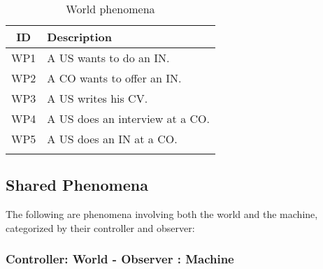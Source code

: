 \renewcommand{\arraystretch}{1.5}
\begin{longtable}{|c|p{10.5cm}|}
    \hline \rowcolor{polimiblue!40}
    \textbf{ID} & \textbf{Description} \\ \hline
    WP1 & A US wants to do an IN. \\ \hline
    WP2 & A CO wants to offer an IN. \\ \hline
    WP3 & A US writes his CV. \\ \hline
    WP4 & A US does an interview at a CO. \\ \hline
    WP5 & A US does an IN at a CO. \\ \hline
\caption{World phenomena}
\end{longtable}

\subsection{Shared Phenomena}
The following are phenomena involving both the world and the machine, categorized by their controller and observer:

\subsubsection{Controller: World - Observer : Machine}
\renewcommand{\arraystretch}{1.5}

